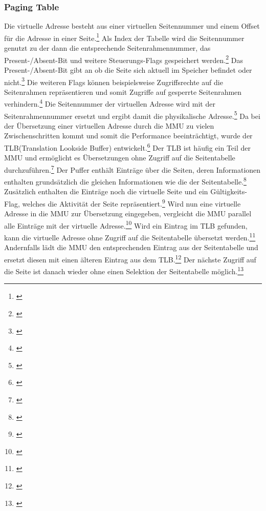 \subsubsection{Paging Table}
Die virtuelle Adresse besteht aus einer virtuellen Seitennummer und einem Offset für die Adresse in einer Seite.\footnote{\cite[S.~257]{Tanenbaum.2016}} Als Index der Tabelle wird die Seitennummer genutzt zu der dann die entsprechende Seitenrahmennummer, das Present-/Absent-Bit und weitere Steuerungs-Flags gespeichert werden.\footnote{\cite[S.~257]{Tanenbaum.2016}} Das Present-/Absent-Bit gibt an ob die Seite sich aktuell im Speicher befindet oder nicht.\footnote{\cite[S.~255]{Tanenbaum.2016}} Die weiteren Flags können beispielsweise Zugriffsrechte auf die Seitenrahmen repräsentieren und somit Zugriffe auf gesperrte Seitenrahmen verhindern.\footnote{\cite[S.~258]{Tanenbaum.2016}} Die Seitennummer der virtuellen Adresse wird mit der Seitenrahmennummer ersetzt und ergibt damit die physikalische Adresse.\footnote{\cite[S.~257]{Tanenbaum.2016}}
Da bei der Übersetzung einer virtuellen Adresse durch die MMU zu vielen Zwischenschritten kommt und somit die Performance beeinträchtigt, wurde der TLB(Translation Lookside Buffer) entwickelt.\footnote{\cite[S.~260--261]{Tanenbaum.2016}} Der TLB ist häufig ein Teil der MMU und ermöglicht es Übersetzungen ohne Zugriff auf die Seitentabelle durchzuführen.\footnote{\cite[S.~260--261]{Tanenbaum.2016}} Der Puffer enthält Einträge über die Seiten, deren Informationen enthalten grundsätzlich die gleichen Informationen wie die der Seitentabelle.\footnote{\cite[S.~260--261]{Tanenbaum.2016}} Zusätzlich enthalten die Einträge noch die virtuelle Seite und ein Gültigkeits-Flag, welches die Aktivität der Seite repräsentiert.\footnote{\cite[S.~260--261]{Tanenbaum.2016}} Wird nun eine virtuelle Adresse in die MMU zur Übersetzung eingegeben, vergleicht die MMU parallel alle Einträge mit der virtuelle Adresse.\footnote{\cite[S.~260--261]{Tanenbaum.2016}} Wird ein Eintrag im TLB gefunden, kann die virtuelle Adresse ohne Zugriff auf die Seitentabelle übersetzt werden.\footnote{\cite[S.~260--261]{Tanenbaum.2016}} Andernfalls lädt die MMU den entsprechenden Eintrag aus der Seitentabelle und ersetzt diesen mit einen älteren Eintrag aus dem TLB.\footnote{\cite[S.~260--261]{Tanenbaum.2016}} Der nächste Zugriff auf die Seite ist danach wieder ohne einen Selektion der Seitentabelle möglich.\footnote{\cite[S.~260--261]{Tanenbaum.2016}}

